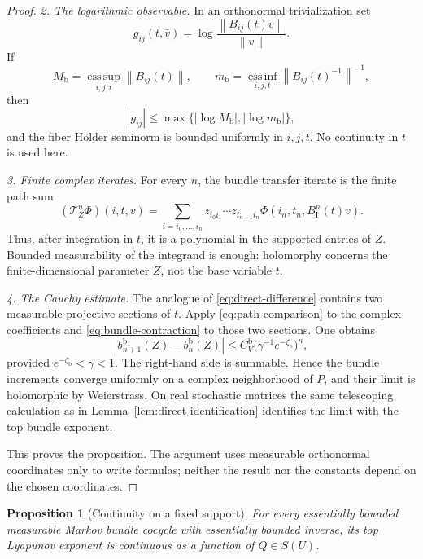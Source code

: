 \documentclass[11pt,a4paper]{amsart}
\newtheorem{proposition}[theorem]{Proposition}
\newcommand{\norm}[1]{\left\lVert #1\right\rVert}
\begin{document}
\begin{proof}
\smallskip
\noindent\emph{2. The logarithmic observable.}
In an orthonormal trivialization set
\[
 g_{ij}(t,\bar v)
 =
 \log\frac{\norm{B_{ij}(t)v}}{\norm v}.
\]
If
\[
 M_{\mathrm b}
 =\operatorname*{ess\,sup}_{i,j,t}\norm{B_{ij}(t)},
 \qquad
 m_{\mathrm b}
 =\operatorname*{ess\,inf}_{i,j,t}
 \norm{B_{ij}(t)^{-1}}^{-1},
\]
then
\[
 |g_{ij}|\le
 \max\{|\log M_{\mathrm b}|,|\log m_{\mathrm b}|\},
\]
and the fiber Hölder seminorm is bounded uniformly in \(i,j,t\).
No continuity in \(t\) is used here.

\smallskip
\noindent\emph{3. Finite complex iterates.}
For every \(n\), the bundle transfer iterate is the finite path sum
\[
 (\mathcal T_Z^n\Phi)(i,t,v)
 =
 \sum_{i=i_0,\ldots,i_n}
 z_{i_0i_1}\cdots z_{i_{n-1}i_n}
 \Phi(i_n,t_n,B_{\mathbf i}^n(t)v).
\]
Thus, after integration in \(t\), it is a polynomial in the supported
entries of \(Z\).  Bounded measurability of the integrand is enough:
holomorphy concerns the finite-dimensional parameter \(Z\), not the
base variable \(t\).

\smallskip
\noindent\emph{4. The Cauchy estimate.}
The analogue of \eqref{eq:direct-difference} contains two measurable
projective sections of \(t\).  Apply
\eqref{eq:path-comparison} to the complex coefficients and
\eqref{eq:bundle-contraction} to those two sections.  One obtains
\[
 |b_{n+1}^{\mathrm b}(Z)-b_n^{\mathrm b}(Z)|
 \le
 C_V^{\mathrm b}
 \bigl(\gamma^{-1}e^{-\zeta_{\mathrm b}}\bigr)^n,
\]
provided \(e^{-\zeta_{\mathrm b}}<\gamma<1\).
The right-hand side is summable.  Hence the bundle increments converge
uniformly on a complex neighborhood of \(P\), and their limit is
holomorphic by Weierstrass.  On real stochastic matrices the same
telescoping calculation as in
Lemma~\ref{lem:direct-identification} identifies the limit with the
top bundle exponent.

This proves the proposition.  The argument uses measurable
orthonormal coordinates only to write formulas; neither the result nor
the constants depend on the chosen coordinates.
\end{proof}

\begin{proposition}[Continuity on a fixed support]
\label{prop:block-continuity}
For every essentially bounded measurable Markov bundle cocycle with
essentially bounded inverse, its top Lyapunov exponent is continuous
as a function of \(Q\in S(U)\).
\end{proposition}
\end{document}
